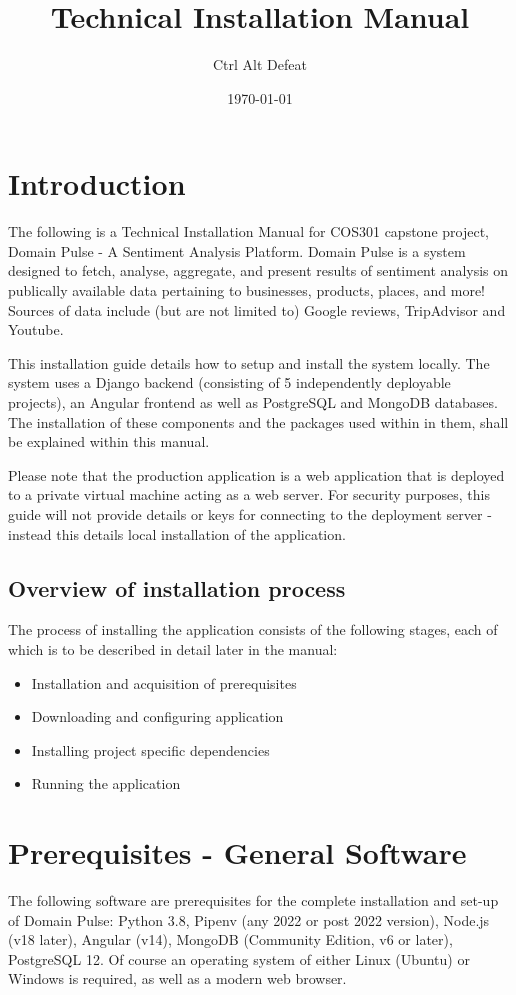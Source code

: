 \documentclass{article}
\title{Technical Installation Manual}
\author{Ctrl Alt Defeat}
\date{\today}
\begin{document}
\maketitle

\tableofcontents


\section{Introduction}
The following is a Technical Installation Manual for COS301 capstone project, Domain Pulse - A Sentiment Analysis Platform. Domain Pulse is
a system designed to fetch, analyse, aggregate, and present results of sentiment analysis on publically available data pertaining to
businesses, products, places, and more! Sources of data include (but are not limited to) Google reviews, TripAdvisor and Youtube.

This installation guide details how to setup and install the system locally. The system uses a Django backend (consisting of 5 independently deployable projects),
an Angular frontend as well as PostgreSQL and MongoDB databases. The installation of these components and the packages used within in
them, shall be explained within this manual.

Please note that the production application is a web application that is deployed to a private virtual machine acting as a web server. For
security purposes, this guide will not provide details or keys for connecting to the deployment server - instead this details local installation
of the application.

\subsection{Overview of installation process}
The process of installing the application consists of the following stages, each of which is to be described in detail later in the manual:
\begin{itemize}
    \item Installation and acquisition of prerequisites
    \item Downloading and configuring application
    \item Installing project specific dependencies
    \item Running the application
\end{itemize}

\section{Prerequisites - General Software}
The following software are prerequisites for the complete installation and set-up of Domain Pulse: Python 3.8, Pipenv (any 2022 or post 2022 version), Node.js (v18 later), Angular (v14), MongoDB (Community Edition, v6 or later), PostgreSQL 12.
Of course an operating system of either Linux (Ubuntu) or Windows is required, as well as a modern web browser.
\end{document}
